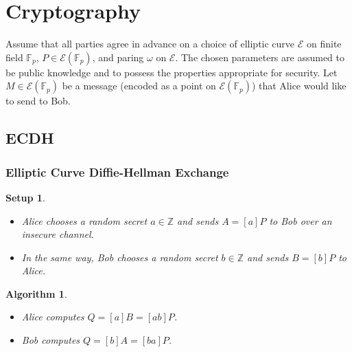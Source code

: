 \documentclass{beamer}
\newtheorem{algorithm}{Algorithm}
\newtheorem{setup}{Setup}
\begin{document}
    \section{Cryptography}
    \begin{frame}
        Assume that all parties agree in advance on a choice of elliptic curve
        \(\mathcal{E}\) on finite field \(\mathbb{F}_p\),
        \(P \in \mathcal{E}(\mathbb{F}_p)\), and paring \(\omega\)
        on \(\mathcal{E}\). \hyperlink{pair}{}
        \vfill
        The chosen parameters are assumed to be public knowledge and to
        possess the properties appropriate for security.
        \vfill
        Let \(M \in \mathcal{E}(\mathbb{F}_p)\) be a message (encoded as
        a point on \(\mathcal{E}(\mathbb{F}_p)\))
        that Alice would like to send to Bob.
    \end{frame}

    \subsection{ECDH}
    \begin{frame}
        \frametitle{Elliptic Curve Diffie-Hellman Exchange}
        \begin{setup}
            \begin{itemize}
                \item Alice chooses a random secret \(a \in \mathbb{Z}\) and
                    sends \(A = [a]P\) to Bob over an insecure channel.
                \item In the same way, Bob chooses a random secret
                \(b \in \mathbb{Z}\) and sends \(B = [b]P\) to Alice.
            \end{itemize}
        \end{setup}
        \vfill
        \begin{algorithm}
            \begin{itemize}
                \item Alice computes \(Q = [a]B = [ab]P\).
                \item Bob computes \(Q = [b]A = [ba]P\).
            \end{itemize}
        \end{algorithm}
    \end{frame}
\end{document}
